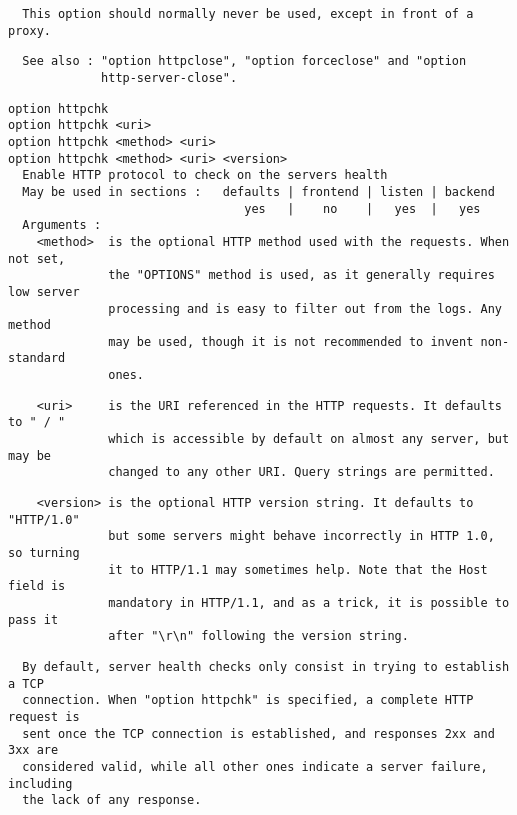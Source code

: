 \begin{verbatim}
  This option should normally never be used, except in front of a proxy.
\end{verbatim}

\begin{verbatim}
  See also : "option httpclose", "option forceclose" and "option
             http-server-close".
\end{verbatim}

\begin{verbatim}
option httpchk
option httpchk <uri>
option httpchk <method> <uri>
option httpchk <method> <uri> <version>
  Enable HTTP protocol to check on the servers health
  May be used in sections :   defaults | frontend | listen | backend
                                 yes   |    no    |   yes  |   yes
  Arguments :
    <method>  is the optional HTTP method used with the requests. When not set,
              the "OPTIONS" method is used, as it generally requires low server
              processing and is easy to filter out from the logs. Any method
              may be used, though it is not recommended to invent non-standard
              ones.
\end{verbatim}

\begin{verbatim}
    <uri>     is the URI referenced in the HTTP requests. It defaults to " / "
              which is accessible by default on almost any server, but may be
              changed to any other URI. Query strings are permitted.
\end{verbatim}

\begin{verbatim}
    <version> is the optional HTTP version string. It defaults to "HTTP/1.0"
              but some servers might behave incorrectly in HTTP 1.0, so turning
              it to HTTP/1.1 may sometimes help. Note that the Host field is
              mandatory in HTTP/1.1, and as a trick, it is possible to pass it
              after "\r\n" following the version string.
\end{verbatim}

\begin{verbatim}
  By default, server health checks only consist in trying to establish a TCP
  connection. When "option httpchk" is specified, a complete HTTP request is
  sent once the TCP connection is established, and responses 2xx and 3xx are
  considered valid, while all other ones indicate a server failure, including
  the lack of any response.
\end{verbatim}

